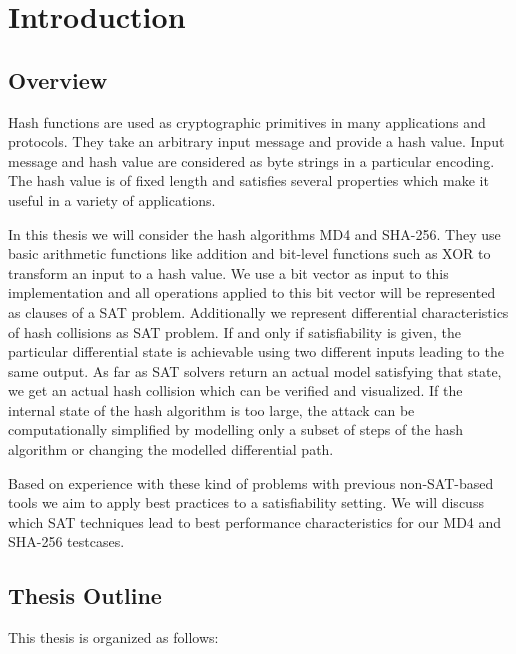 \renewcommand*\chappic{img/intro.pdf}
\renewcommand*\chapquote{}
\renewcommand*\chapquotesrc{}
%
\chapter{Introduction}
\label{ch:intro}
\section{Overview}
\label{sec:intro-overview}
%
Hash functions are used as cryptographic primitives in many applications and protocols.
They take an arbitrary input message and provide a hash value. Input message and hash value
are considered as byte strings in a particular encoding.
The hash value is of fixed length and satisfies several properties which make it useful
in a variety of applications.

In this thesis we will consider the hash algorithms MD4 and SHA-256.
They use basic arithmetic functions like addition and bit-level functions
such as XOR to transform an input to a hash value. We use a bit vector
as input to this implementation and all operations applied to this bit vector
will be represented as clauses of a SAT problem. Additionally we represent
differential characteristics of hash collisions as SAT problem. If and only if
satisfiability is given, the particular differential state is achievable
using two different inputs leading to the same output. As far as SAT solvers
return an actual model satisfying that state, we get an actual hash collision
which can be verified and visualized.
If the internal state of the hash algorithm is too large, the attack can be
computationally simplified by modelling only a subset of steps of the hash algorithm
or changing the modelled differential path.

Based on experience with these kind of problems with previous non-SAT-based tools
we aim to apply best practices to a satisfiability setting.
We will discuss which SAT techniques lead to best performance characteristics
for our MD4 and SHA-256 testcases.

\section{Thesis Outline}
\label{sec:intro-outline}
%
This thesis is organized as follows:

